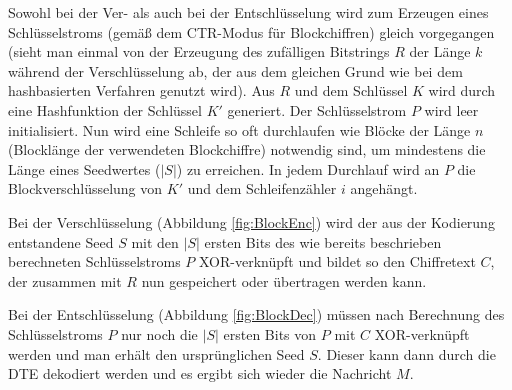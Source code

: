 Sowohl bei der Ver- als auch bei der Entschlüsselung wird zum Erzeugen eines Schlüsselstroms (gemäß dem CTR-Modus für Blockchiffren) gleich vorgegangen (sieht man einmal von der Erzeugung des zufälligen Bitstrings \(R\) der Länge \(k\) während der Verschlüsselung ab, der aus dem gleichen Grund wie bei dem hashbasierten Verfahren genutzt wird). Aus \(R\) und dem Schlüssel \(K\) wird durch eine Hashfunktion der Schlüssel \(K'\) generiert. Der Schlüsselstrom \(P\) wird leer initialisiert. Nun wird eine Schleife so oft durchlaufen wie Blöcke der Länge \(n\) (Blocklänge der verwendeten Blockchiffre) notwendig sind, um mindestens die Länge eines Seedwertes (\(|S|\)) zu erreichen. In jedem Durchlauf wird an \(P\) die Blockverschlüsselung von \(K'\) und dem Schleifenzähler \(i\) angehängt.

Bei der Verschlüsselung (Abbildung \ref{fig:BlockEnc}) wird der aus der Kodierung entstandene Seed \(S\) mit den \(|S|\) ersten Bits des wie bereits beschrieben berechneten Schlüsselstroms \(P\) XOR-verknüpft und bildet so den Chiffretext \(C\), der zusammen mit \(R\) nun gespeichert oder übertragen werden kann.

Bei der Entschlüsselung (Abbildung \ref{fig:BlockDec}) müssen nach Berechnung des Schlüsselstroms \(P\) nur noch die \(|S|\) ersten Bits von \(P\) mit \(C\) XOR-verknüpft werden und man erhält den ursprünglichen Seed \(S\). Dieser kann dann durch die DTE  dekodiert werden und es ergibt sich wieder die Nachricht \(M\).